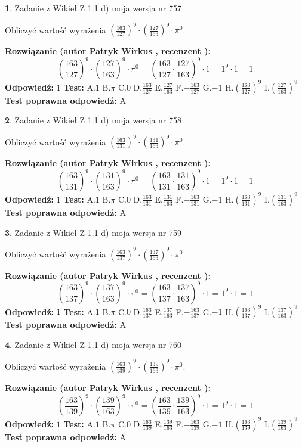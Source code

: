 \documentclass[12pt, a4paper]{article}
\theoremstyle{definition} %
\newtheorem{zad}{}
\newcommand{\zadStart}[1]{\begin{zad}#1\newline}
\newcommand{\zadStop}{\end{zad}}
\newcommand{\rozwStart}[2]{\noindent \textbf{Rozwiązanie (autor #1 , recenzent #2): }\newline}
\newcommand{\rozwStop}{\newline}
\newcommand{\odpStart}{\noindent \textbf{Odpowiedź:}\newline}
\newcommand{\odpStop}{\newline}
\newcommand{\testStart}{\noindent \textbf{Test:}\newline}
\newcommand{\testStop}{\newline}
\newcommand{\kluczStart}{\noindent \textbf{Test poprawna odpowiedź:}\newline}
\newcommand{\kluczStop}{\newline}
\begin{document}
\zadStart{Zadanie z Wikieł Z 1.1 d) moja wersja nr 757}

Obliczyć wartość wyrażenia $(\frac{163}{127})^{9} \cdot (\frac{127}{163})^{9} \cdot \pi^{0}$.
\zadStop
\rozwStart{Patryk Wirkus}{}
$$(\frac{163}{127})^{9} \cdot (\frac{127}{163})^{9} \cdot \pi^{0} = (\frac{163}{127} \cdot \frac{127}{163})^{9} \cdot 1 = 1^{9} \cdot 1 = 1$$
\rozwStop
\odpStart
$1$
\odpStop
\testStart
A.$1$ B.$\pi$ C.$0$ D.$\frac{163}{127}$ E.$\frac{127}{163}$
F.$-\frac{163}{127}$ G.$-1$
H.$(\frac{163}{127})^{9}$
I.$(\frac{127}{163})^{9}$
\testStop
\kluczStart
A
\kluczStop



\zadStart{Zadanie z Wikieł Z 1.1 d) moja wersja nr 758}

Obliczyć wartość wyrażenia $(\frac{163}{131})^{9} \cdot (\frac{131}{163})^{9} \cdot \pi^{0}$.
\zadStop
\rozwStart{Patryk Wirkus}{}
$$(\frac{163}{131})^{9} \cdot (\frac{131}{163})^{9} \cdot \pi^{0} = (\frac{163}{131} \cdot \frac{131}{163})^{9} \cdot 1 = 1^{9} \cdot 1 = 1$$
\rozwStop
\odpStart
$1$
\odpStop
\testStart
A.$1$ B.$\pi$ C.$0$ D.$\frac{163}{131}$ E.$\frac{131}{163}$
F.$-\frac{163}{131}$ G.$-1$
H.$(\frac{163}{131})^{9}$
I.$(\frac{131}{163})^{9}$
\testStop
\kluczStart
A
\kluczStop



\zadStart{Zadanie z Wikieł Z 1.1 d) moja wersja nr 759}

Obliczyć wartość wyrażenia $(\frac{163}{137})^{9} \cdot (\frac{137}{163})^{9} \cdot \pi^{0}$.
\zadStop
\rozwStart{Patryk Wirkus}{}
$$(\frac{163}{137})^{9} \cdot (\frac{137}{163})^{9} \cdot \pi^{0} = (\frac{163}{137} \cdot \frac{137}{163})^{9} \cdot 1 = 1^{9} \cdot 1 = 1$$
\rozwStop
\odpStart
$1$
\odpStop
\testStart
A.$1$ B.$\pi$ C.$0$ D.$\frac{163}{137}$ E.$\frac{137}{163}$
F.$-\frac{163}{137}$ G.$-1$
H.$(\frac{163}{137})^{9}$
I.$(\frac{137}{163})^{9}$
\testStop
\kluczStart
A
\kluczStop



\zadStart{Zadanie z Wikieł Z 1.1 d) moja wersja nr 760}

Obliczyć wartość wyrażenia $(\frac{163}{139})^{9} \cdot (\frac{139}{163})^{9} \cdot \pi^{0}$.
\zadStop
\rozwStart{Patryk Wirkus}{}
$$(\frac{163}{139})^{9} \cdot (\frac{139}{163})^{9} \cdot \pi^{0} = (\frac{163}{139} \cdot \frac{139}{163})^{9} \cdot 1 = 1^{9} \cdot 1 = 1$$
\rozwStop
\odpStart
$1$
\odpStop
\testStart
A.$1$ B.$\pi$ C.$0$ D.$\frac{163}{139}$ E.$\frac{139}{163}$
F.$-\frac{163}{139}$ G.$-1$
H.$(\frac{163}{139})^{9}$
I.$(\frac{139}{163})^{9}$
\testStop
\kluczStart
A
\kluczStop
\end{document}
